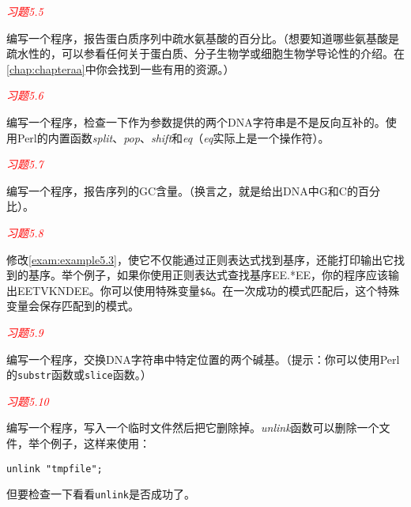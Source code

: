\textcolor{red}{\textit{习题5.5}}
\begin{adjustwidth}{1cm}{}
编写一个程序，报告蛋白质序列中疏水氨基酸的百分比。（想要知道哪些氨基酸是疏水性的，可以参看任何关于蛋白质、分子生物学或细胞生物学导论性的介绍。在\autoref{chap:chapteraa}中你会找到一些有用的资源。）
\end{adjustwidth}

\textcolor{red}{\textit{习题5.6}}
\begin{adjustwidth}{1cm}{}
编写一个程序，检查一下作为参数提供的两个DNA字符串是不是反向互补的。使用Perl的内置函数\textit{split}、\textit{pop}、\textit{shift}和\textit{eq}（\textit{eq}实际上是一个操作符）。
\end{adjustwidth}

\textcolor{red}{\textit{习题5.7}}
\begin{adjustwidth}{1cm}{}
编写一个程序，报告序列的GC含量。（换言之，就是给出DNA中G和C的百分比）。
\end{adjustwidth}

\textcolor{red}{\textit{习题5.8}}
\begin{adjustwidth}{1cm}{}
修改\autoref{exam:example5.3}，使它不仅能通过正则表达式找到基序，还能打印输出它找到的基序。举个例子，如果你使用正则表达式查找基序EE.*EE，你的程序应该输出EETVKNDEE。你可以使用特殊变量\verb|$&|。在一次成功的模式匹配后，这个特殊变量会保存匹配到的模式。
\end{adjustwidth}

\textcolor{red}{\textit{习题5.9}}
\begin{adjustwidth}{1cm}{}
编写一个程序，交换DNA字符串中特定位置的两个碱基。（提示：你可以使用Perl的\verb|substr|函数或\verb|slice|函数。）
\end{adjustwidth}

\textcolor{red}{\textit{习题5.10}}
\begin{adjustwidth}{1cm}{}
编写一个程序，写入一个临时文件然后把它删除掉。\textit{unlink}函数可以删除一个文件，举个例子，这样来使用：
\begin{lstlisting}
unlink "tmpfile";
\end{lstlisting}
但要检查一下看看\verb|unlink|是否成功了。
\end{adjustwidth}
